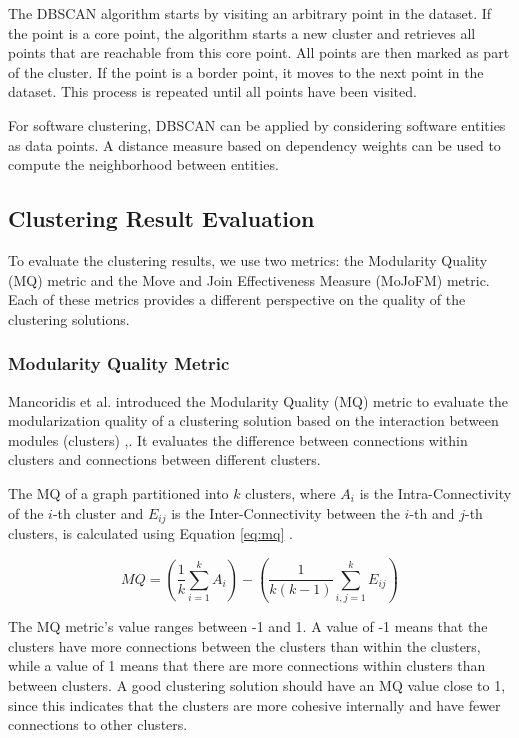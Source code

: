 \documentclass{ieeeaccess}
\begin{document}
The DBSCAN algorithm starts by visiting an arbitrary point in the dataset. If the point is a core point, the algorithm starts a new cluster and retrieves all points that are reachable from this core point. All points are then marked as part of the cluster. If the point is a border point, it moves to the next point in the dataset. This process is repeated until all points have been visited.

For software clustering, DBSCAN can be applied by considering software entities as data points. A distance measure based on dependency weights can be used to compute the neighborhood between entities.

\subsection{Clustering Result Evaluation}
\label{subsec:evaluation_def}

To evaluate the clustering results, we use two metrics: the Modularity Quality (MQ) metric and the Move and Join Effectiveness Measure (MoJoFM) metric. Each of these metrics provides a different perspective on the quality of the clustering solutions. 

\subsubsection{Modularity Quality Metric}

Mancoridis et al. introduced the Modularity Quality (MQ) metric to evaluate the modularization quality of a clustering solution based on the interaction between modules (clusters) \cite{b2},\cite{b10}. It evaluates the difference between connections within clusters and connections between different clusters.

The MQ of a graph partitioned into \( k \) clusters, where \( A_i \) is the Intra-Connectivity of the \( i \)-th cluster and \( E_{ij} \) is the Inter-Connectivity between the \( i \)-th and \( j \)-th clusters, is calculated using Equation \eqref{eq:mq} \cite{b2}.

\begin{equation}
MQ = \left( \frac{1}{k} \sum_{i=1}^{k} A_i \right) - \left( \frac{1}{k(k-1)} \sum_{i,j=1}^{k} E_{ij} \right)
\label{eq:mq}
\end{equation}

The MQ metric's value ranges between -1 and 1. A value of -1 means that the clusters have more connections between the clusters than within the clusters, while a value of 1 means that there are more connections within clusters than between clusters. A good clustering solution should have an MQ value close to 1, since this indicates that the clusters are more cohesive internally and have fewer connections to other clusters.
\end{document}
